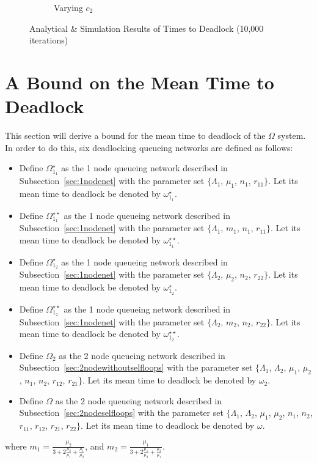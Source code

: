\documentclass{article}
\begin{document}
\begin{figure}[!htbp]
\begin{center}
\begin{subfigure}[b]{0.34\textwidth}
    \caption{Varying $c_2$}
    \label{fig:2Nms_c2}
  \end{subfigure}
  \end{center}
  \caption{Analytical \& Simulation Results of Times to Deadlock (10,000 iterations)}
  \label{fig:timestodeadlock2nodemultiserver}
\end{figure}




\section{A Bound on the Mean Time to Deadlock}\label{sec:bound}
This section will derive a bound for the mean time to deadlock of the $\Omega$ system.
In order to do this, six deadlocking queueing networks are defined as follows:

\begin{itemize}
  \item Define $\Omega_{1_1}^{\star}$ as the 1 node queueing network described in Subsection~\ref{sec:1nodenet} with the parameter set $\{\Lambda_1$, $\mu_1$, $n_1$, $r_{11}\}$. Let its mean time to deadlock be denoted by $\omega_{1_1}^{\star}$.
  \item Define $\Omega_{1_1}^{\star\star}$ as the 1 node queueing network described in Subsection~\ref{sec:1nodenet} with the parameter set $\{\Lambda_1$, $m_1$, $n_1$, $r_{11}\}$. Let its mean time to deadlock be denoted by $\omega_{1_1}^{\star\star}$.
  \item Define $\Omega_{1_2}^{\star}$ as the 1 node queueing network described in Subsection~\ref{sec:1nodenet} with the parameter set $\{\Lambda_2$, $\mu_2$, $n_2$, $r_{22}\}$. Let its mean time to deadlock be denoted by $\omega_{1_2}^{\star}$.
  \item Define $\Omega_{1_2}^{\star\star}$ as the 1 node queueing network described in Subsection~\ref{sec:1nodenet} with the parameter set $\{\Lambda_2$, $m_2$, $n_2$, $r_{22}\}$. Let its mean time to deadlock be denoted by $\omega_{1_2}^{\star\star}$.
  \item Define $\Omega_2$ as the 2 node queueing network described in Subsection~\ref{sec:2nodewithoutselfloops} with the parameter set $\{\Lambda_1$, $\Lambda_2$, $\mu_1$, $\mu_2$, $n_1$, $n_2$, $r_{12}$, $r_{21}\}$. Let its mean time to deadlock be denoted by $\omega_2$.
  \item Define $\Omega$ as the 2 node queueing network described in Subsection~\ref{sec:2nodeselfloops} with the parameter set $\{\Lambda_1$, $\Lambda_2$, $\mu_1$, $\mu_2$, $n_1$, $n_2$, $r_{11}$, $r_{12}$, $r_{21}$, $r_{22}\}$. Let its mean time to deadlock be denoted by $\omega$.
\end{itemize}
where $m_1 = \frac{\mu_2}{3 + 2\frac{\mu_2}{\mu_1} + \frac{\mu_1}{\mu_2}}$, and $m_2 = \frac{\mu_1}{3 + 2\frac{\mu_1}{\mu_2} + \frac{\mu_2}{\mu_1}}$.
\end{document}
